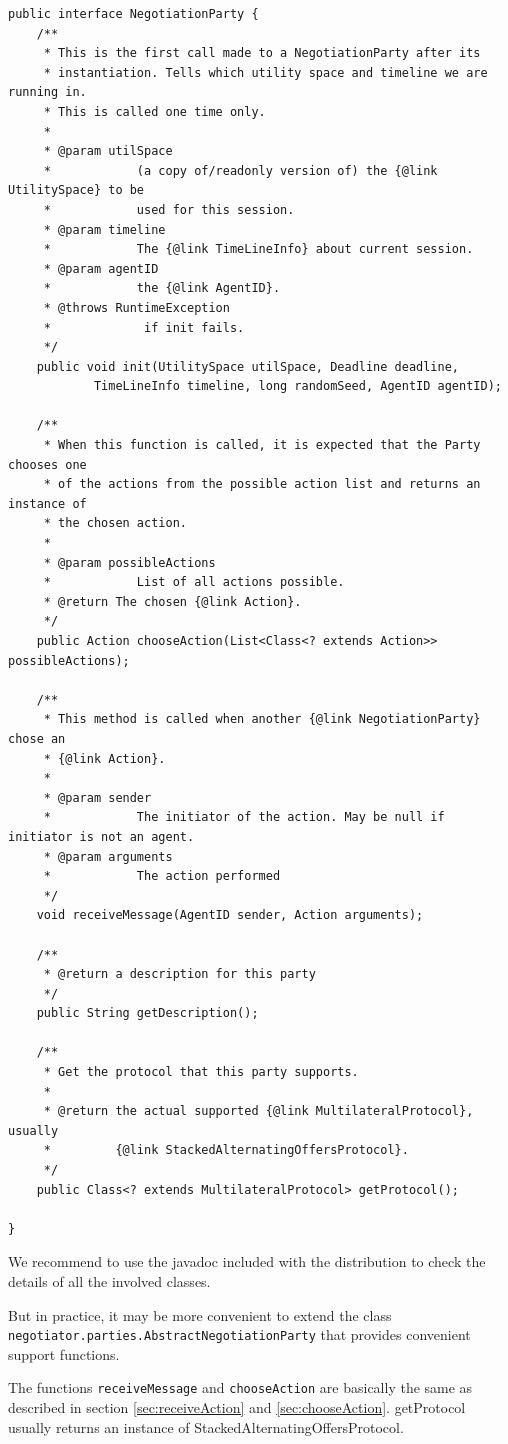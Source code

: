 \documentclass[]{article}
\begin{document}
\begin{lstlisting}
public interface NegotiationParty {
	/**
	 * This is the first call made to a NegotiationParty after its
	 * instantiation. Tells which utility space and timeline we are running in.
	 * This is called one time only.
	 *
	 * @param utilSpace
	 *            (a copy of/readonly version of) the {@link UtilitySpace} to be
	 *            used for this session.
	 * @param timeline
	 *            The {@link TimeLineInfo} about current session.
	 * @param agentID
	 *            the {@link AgentID}.
	 * @throws RuntimeException
	 *             if init fails.
	 */
	public void init(UtilitySpace utilSpace, Deadline deadline,
			TimeLineInfo timeline, long randomSeed, AgentID agentID);

	/**
	 * When this function is called, it is expected that the Party chooses one
	 * of the actions from the possible action list and returns an instance of
	 * the chosen action.
	 *
	 * @param possibleActions
	 *            List of all actions possible.
	 * @return The chosen {@link Action}.
	 */
	public Action chooseAction(List<Class<? extends Action>> possibleActions);

	/**
	 * This method is called when another {@link NegotiationParty} chose an
	 * {@link Action}.
	 *
	 * @param sender
	 *            The initiator of the action. May be null if initiator is not an agent.
	 * @param arguments
	 *            The action performed
	 */
	void receiveMessage(AgentID sender, Action arguments);

	/**
	 * @return a description for this party
	 */
	public String getDescription();

	/**
	 * Get the protocol that this party supports.
	 * 
	 * @return the actual supported {@link MultilateralProtocol}, usually
	 *         {@link StackedAlternatingOffersProtocol}.
	 */
	public Class<? extends MultilateralProtocol> getProtocol();

}
\end{lstlisting}

We recommend to use the javadoc included with the distribution to check the details of all the involved classes. 

But in practice, it may be more convenient to extend the class \texttt{negotiator.parties.AbstractNegotiationParty} that provides convenient support functions. 

The functions \verb|receiveMessage| and \verb|chooseAction| are basically the same as described in section \ref{sec:receiveAction} and \ref{sec:chooseAction}. getProtocol usually returns an instance of StackedAlternatingOffersProtocol.
\end{document}
